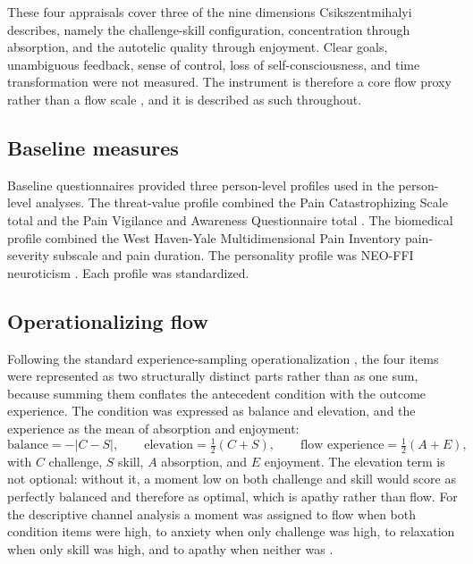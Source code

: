 \documentclass[11pt,a4paper]{article}
\begin{document}
These four appraisals cover three of the nine dimensions Csikszentmihalyi describes, namely the
challenge-skill configuration, concentration through absorption, and the autotelic quality through
enjoyment. Clear goals, unambiguous feedback, sense of control, loss of self-consciousness, and
time transformation were not measured. The instrument is therefore a core flow proxy rather than a
flow scale \citep{jackson2002assessing}, and it is described as such throughout.

\subsection{Baseline measures}
Baseline questionnaires provided three person-level profiles used in the person-level analyses.
The threat-value profile combined the Pain Catastrophizing Scale total \citep{sullivan1995pain} and
the Pain Vigilance and Awareness Questionnaire total \citep{roelofs2003pvaq}. The biomedical
profile combined the West Haven-Yale Multidimensional Pain Inventory pain-severity subscale
\citep{kerns1985mpi} and pain duration. The personality profile was NEO-FFI neuroticism
\citep{costa1992neo}. Each profile was standardized.

\subsection{Operationalizing flow}
Following the standard experience-sampling operationalization
\citep{massimini1988systematic,moneta1996effect}, the four items were represented as two
structurally distinct parts rather than as one sum, because summing them conflates the antecedent
condition with the outcome experience. The condition was expressed as balance and elevation, and
the experience as the mean of absorption and enjoyment:
%
\begin{equation}
\text{balance} = -\lvert C - S \rvert, \qquad
\text{elevation} = \tfrac{1}{2}(C + S), \qquad
\text{flow experience} = \tfrac{1}{2}(A + E),
\label{eq:flow}
\end{equation}
%
with $C$ challenge, $S$ skill, $A$ absorption, and $E$ enjoyment. The elevation term is not
optional: without it, a moment low on both challenge and skill would score as perfectly balanced
and therefore as optimal, which is apathy rather than flow. For the descriptive channel analysis a
moment was assigned to flow when both condition items were high, to anxiety when only challenge
was high, to relaxation when only skill was high, and to apathy when neither was
\citep{carli1988quality}.
\end{document}
